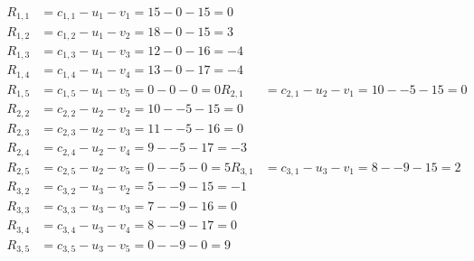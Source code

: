 \[
\begin{aligned}
R_{1,1} &= c_{1,1} - u_{1} - v_{1} = 15 - 0 - 15 = 0 \\
R_{1,2} &= c_{1,2} - u_{1} - v_{2} = 18 - 0 - 15 = 3 \\
R_{1,3} &= c_{1,3} - u_{1} - v_{3} = 12 - 0 - 16 = -4 \\
R_{1,4} &= c_{1,4} - u_{1} - v_{4} = 13 - 0 - 17 = -4 \\
R_{1,5} &= c_{1,5} - u_{1} - v_{5} = 0 - 0 - 0 = 0 
R_{2,1} &= c_{2,1} - u_{2} - v_{1} = 10 - -5 - 15 = 0 \\
R_{2,2} &= c_{2,2} - u_{2} - v_{2} = 10 - -5 - 15 = 0 \\
R_{2,3} &= c_{2,3} - u_{2} - v_{3} = 11 - -5 - 16 = 0 \\
R_{2,4} &= c_{2,4} - u_{2} - v_{4} = 9 - -5 - 17 = -3 \\
R_{2,5} &= c_{2,5} - u_{2} - v_{5} = 0 - -5 - 0 = 5 
R_{3,1} &= c_{3,1} - u_{3} - v_{1} = 8 - -9 - 15 = 2 \\
R_{3,2} &= c_{3,2} - u_{3} - v_{2} = 5 - -9 - 15 = -1 \\
R_{3,3} &= c_{3,3} - u_{3} - v_{3} = 7 - -9 - 16 = 0 \\
R_{3,4} &= c_{3,4} - u_{3} - v_{4} = 8 - -9 - 17 = 0 \\
R_{3,5} &= c_{3,5} - u_{3} - v_{5} = 0 - -9 - 0 = 9 
\end{aligned}
\]

